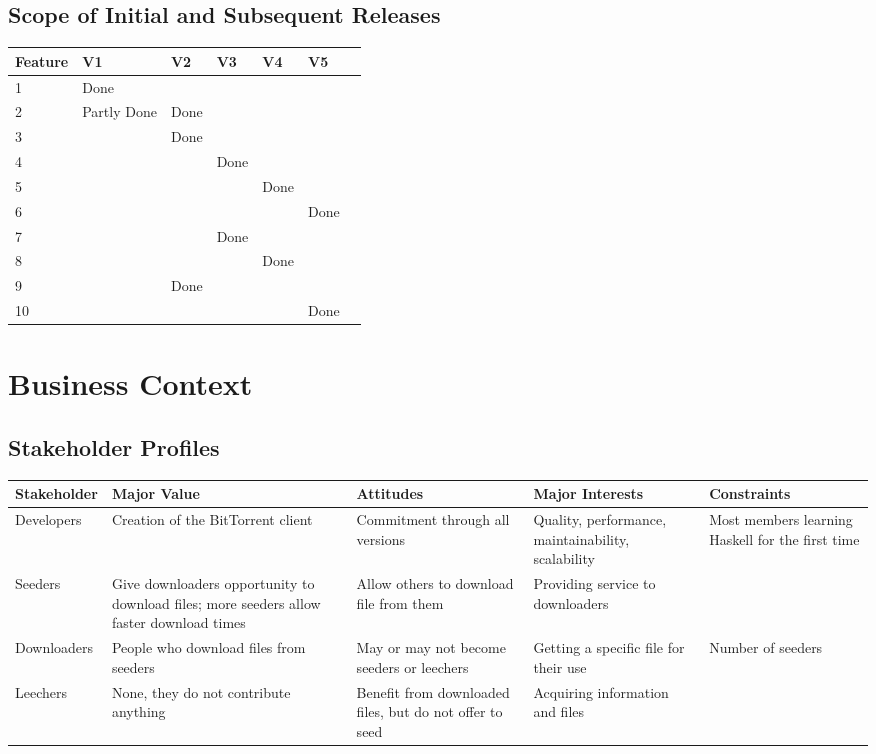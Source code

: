 \documentclass[letter]{scrartcl}
\begin{document}
\subsection{Scope of Initial and Subsequent Releases}
\begin{tabularx}{\textwidth}{| X | X | X | X | X | X | X |}
\hline
\textbf{Feature} & \textbf{V1} & \textbf{V2} & \textbf{V3} & \textbf{V4} & \textbf{V5} \\
\hline
\hline
1 & Done & & & & \\
\hline
2 & Partly Done & Done & & & \\
\hline
3 & & Done & & & \\
\hline
4 & & & Done & & \\
\hline
5 & & & & Done & \\
\hline
6 & & & & & Done \\
\hline
7 & & & Done & & \\
\hline
8 & & & & Done & \\
\hline
9 & & Done & & & \\
\hline
10 & & & & & Done \\
\hline
\end{tabularx}



\section{Business Context}
\subsection{Stakeholder Profiles}
\tabcolsep=0.11cm
\begin{tabularx}{\textwidth}{| X | X | X | X | X |}
\hline
\textbf{Stakeholder} & \textbf{Major Value} & \textbf{Attitudes} & \textbf{Major Interests} & \textbf{Constraints} \\
\hline
\hline
Developers & Creation of the BitTorrent client & Commitment through all versions & Quality, performance, maintainability, scalability & Most members learning Haskell for the first time \\
\hline
Seeders & Give downloaders opportunity to download files; more seeders allow faster download times & Allow others to download file from them & Providing service to downloaders &  \\ 
\hline
Downloaders & People who download files from seeders & May or may not become seeders or leechers & Getting a specific file for their use & Number of seeders \\
\hline
Leechers& None, they do not contribute anything & Benefit from downloaded files, but do not offer to seed & Acquiring information and files & \\
\hline
\end{tabularx}
\end{document}
